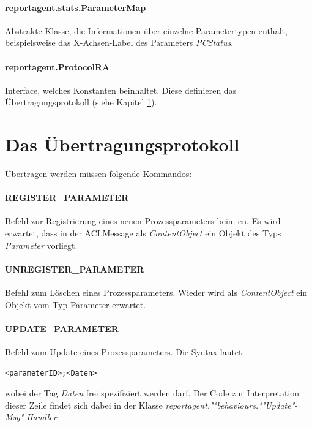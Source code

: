 	\paragraph{reportagent.stats.ParameterMap}
	Abstrakte Klasse, die Informationen über einzelne Parametertypen enthält, beispielsweise das X-Achsen-Label des Parameters \emph{PCStatus}.

	\paragraph{reportagent.ProtocolRA}
	Interface, welches Konstanten beinhaltet. Diese definieren das Übertragungsprotokoll (siehe Kapitel \ref{kap_protocol}).

	\section{Das Übertragungsprotokoll}\label{kap_protocol}
	Übertragen werden müssen folgende Kommandos:

	\paragraph{REGISTER\_PARAMETER}
	Befehl zur Registrierung eines neuen Prozessparameters beim \repag{}en. Es wird erwartet, dass in der ACLMessage als \emph{ContentObject} ein Objekt des Typs \emph{Parameter} vorliegt.

	\paragraph{UNREGISTER\_PARAMETER}
	Befehl zum Löschen eines Prozessparameters. Wieder wird als \emph{ContentObject} ein Objekt vom Typ Parameter erwartet.

	\paragraph{UPDATE\_PARAMETER}\label{kap_UpdateMsg}
	Befehl zum Update eines Prozessparameters. Die Syntax lautet:

	\begin{lstlisting}[caption={Syntax UPDATE\_PARAMETER},label={lst_syntax_datentag}]
		<parameterID>;<Daten>
	\end{lstlisting}

	wobei der Tag \textit{Daten} frei spezifiziert werden darf. Der Code zur Interpretation dieser Zeile findet sich dabei in der Klasse \emph{reportagent.""behaviours.""Update"-Msg"-Handler}.

